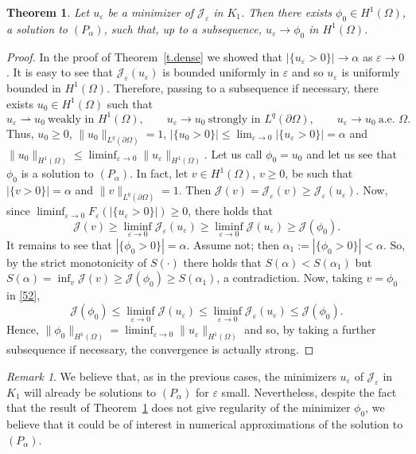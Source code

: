 \documentclass[11pt]{amsart}
\newtheorem{theorem}{Theorem}[section]
\theoremstyle{definition}
\theoremstyle{remark}
\newtheorem{remark}{Remark}[section]
\numberwithin{equation}{section}
\newcommand{\cJ}{\mathcal{J}}
\begin{document}
\begin{theorem}\label{t.conv}
Let $u_\varepsilon$ be a minimizer of $\cJ_\varepsilon$ in $K_1$. Then there exists $\phi_0\in H^1(\Omega)$, a solution to $(P_\alpha)$, such that, up to a subsequence, $u_\varepsilon\to\phi_0$ in $H^1(\Omega)$.
\end{theorem}

\begin{proof}
In the proof of Theorem~\ref{t.dense} we showed that $|\{u_\varepsilon>0\}|\to\alpha$ as $\varepsilon\to0$. It is easy to see that $\cJ_\varepsilon(u_\varepsilon)$ is bounded uniformly in $\varepsilon$ and so $u_\varepsilon$ is uniformly bounded in $H^1(\Omega)$. Therefore, passing to a subsequence if necessary, there exists $u_0\in H^1(\Omega)$ such that
\[
u_\varepsilon\rightharpoonup u_0\ \text{weakly in } H^1(\Omega),\qquad u_\varepsilon\to u_0\ \text{strongly in } L^q(\partial\Omega),\qquad u_\varepsilon\to u_0\ \text{a.e. }\Omega.
\]
Thus, $u_0\ge0$, $\|u_0\|_{L^q(\partial\Omega)}=1$, $|\{u_0>0\}|\le\lim_{\varepsilon\to0}|\{u_\varepsilon>0\}|=\alpha$ and $\|u_0\|_{H^1(\Omega)}\le\liminf_{\varepsilon\to0}\|u_\varepsilon\|_{H^1(\Omega)}$. Let us call $\phi_0=u_0$ and let us see that $\phi_0$ is a solution to $(P_\alpha)$. In fact, let $v\in H^1(\Omega)$, $v\ge0$, be such that $|\{v>0\}|=\alpha$ and $\|v\|_{L^q(\partial\Omega)}=1$. Then $\cJ(v)=\cJ_\varepsilon(v)\ge\cJ_\varepsilon(u_\varepsilon)$. Now, since $\liminf_{\varepsilon\to0}F_\varepsilon(|\{u_\varepsilon>0\}|)\ge0$, there holds that
\begin{equation}\label{52}
\cJ(v)\ge\liminf_{\varepsilon\to0}\cJ_\varepsilon(u_\varepsilon)\ge\liminf_{\varepsilon\to0}\cJ(u_\varepsilon)\ge\cJ(\phi_0).
\end{equation}
It remains to see that $|\{\phi_0>0\}|=\alpha$. Assume not; then $\alpha_1:=|\{\phi_0>0\}|<\alpha$. So, by the strict monotonicity of $S(\cdot)$ there holds that $S(\alpha)<S(\alpha_1)$ but $S(\alpha)=\inf_v\cJ(v)\ge\cJ(\phi_0)\ge S(\alpha_1)$, a contradiction. Now, taking $v=\phi_0$ in \eqref{52},
\[
\cJ(\phi_0)\le\liminf_{\varepsilon\to0}\cJ(u_\varepsilon)\le\liminf_{\varepsilon\to0}\cJ_\varepsilon(u_\varepsilon)\le\cJ(\phi_0).
\]
Hence, $\|\phi_0\|_{H^1(\Omega)}=\liminf_{\varepsilon\to0}\|u_\varepsilon\|_{H^1(\Omega)}$ and so, by taking a further subsequence if necessary, the convergence is actually strong.
\end{proof}

\begin{remark}\label{r.final}
We believe that, as in the previous cases, the minimizers $u_\varepsilon$ of $\cJ_\varepsilon$ in $K_1$ will already be solutions to $(P_\alpha)$ for $\varepsilon$ small. Nevertheless, despite the fact that the result of Theorem~\ref{t.conv} does not give regularity of the minimizer $\phi_0$, we believe that it could be of interest in numerical approximations of the solution to $(P_\alpha)$.
\end{remark}
\end{document}
